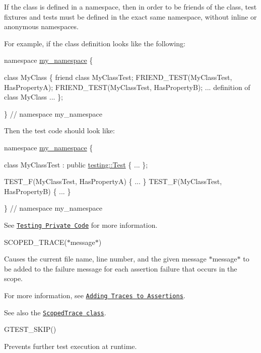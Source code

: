 If the class is defined in a namespace, then in order to be friends of the class, test fixtures and tests must be defined in the exact same namespace, without inline or anonymous namespaces.

For example, if the class definition looks like the following\+:


\begin{DoxyCode}
\textcolor{keyword}{namespace }\mbox{\hyperlink{namespacemy__namespace}{my\_namespace}} \{

\textcolor{keyword}{class }MyClass \{
  \textcolor{keyword}{friend} \textcolor{keyword}{class }MyClassTest;
  FRIEND\_TEST(MyClassTest, HasPropertyA);
  FRIEND\_TEST(MyClassTest, HasPropertyB);
  ... definition of \textcolor{keyword}{class }MyClass ...
\};

\}  \textcolor{comment}{// namespace my\_namespace}
\end{DoxyCode}


Then the test code should look like\+:


\begin{DoxyCode}
\textcolor{keyword}{namespace }\mbox{\hyperlink{namespacemy__namespace}{my\_namespace}} \{

\textcolor{keyword}{class }MyClassTest : \textcolor{keyword}{public} \mbox{\hyperlink{classtesting_1_1Test}{testing::Test}} \{
  ...
\};

TEST\_F(MyClassTest, HasPropertyA) \{ ... \}
TEST\_F(MyClassTest, HasPropertyB) \{ ... \}

\}  \textcolor{comment}{// namespace my\_namespace}
\end{DoxyCode}


See \href{../advanced.md#testing-private-code}{\tt Testing Private Code} for more information.

{\ttfamily S\+C\+O\+P\+E\+D\+\_\+\+T\+R\+A\+CE(}$\ast${\ttfamily message}$\ast${\ttfamily )}

Causes the current file name, line number, and the given message $\ast${\ttfamily message}$\ast$ to be added to the failure message for each assertion failure that occurs in the scope.

For more information, see \href{../advanced.md#adding-traces-to-assertions}{\tt Adding Traces to Assertions}.

See also the \href{#ScopedTrace}{\tt {\ttfamily Scoped\+Trace} class}.

{\ttfamily G\+T\+E\+S\+T\+\_\+\+S\+K\+I\+P()}

Prevents further test execution at runtime.

